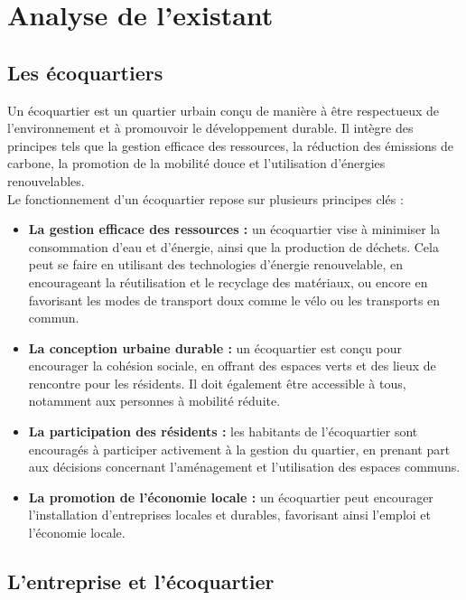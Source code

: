 \chapter{Analyse de l'existant}

\section{Les écoquartiers}

Un écoquartier est un quartier urbain conçu de manière à être respectueux de l'environnement et à promouvoir le développement durable. Il intègre des principes tels que la gestion efficace des ressources, la réduction des émissions de carbone, la promotion de la mobilité douce et l'utilisation d'énergies renouvelables.\\

Le fonctionnement d'un écoquartier repose sur plusieurs principes clés :
\begin{itemize}
\item \textbf{La gestion efficace des ressources :} un écoquartier vise à minimiser la consommation d'eau et d'énergie, ainsi que la production de déchets. Cela peut se faire en utilisant des technologies d'énergie renouvelable, en encourageant la réutilisation et le recyclage des matériaux, ou encore en favorisant les modes de transport doux comme le vélo ou les transports en commun.
\item \textbf{La conception urbaine durable :} un écoquartier est conçu pour encourager la cohésion sociale, en offrant des espaces verts et des lieux de rencontre pour les résidents. Il doit également être accessible à tous, notamment aux personnes à mobilité réduite.
\item \textbf{La participation des résidents :} les habitants de l'écoquartier sont encouragés à participer activement à la gestion du quartier, en prenant part aux décisions concernant l'aménagement et l'utilisation des espaces communs.
\item \textbf{La promotion de l'économie locale :} un écoquartier peut encourager l'installation d'entreprises locales et durables, favorisant ainsi l'emploi et l'économie locale.
\end{itemize}

\newpage

\section{L'entreprise et l'écoquartier}

